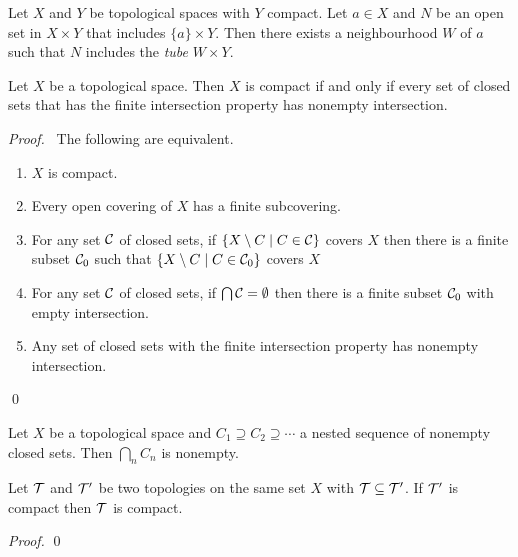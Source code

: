 \begin{corollary}
    Let $X$ and $Y$ be topological spaces with $Y$ compact. Let $a \in X$
    and $N$ be an open set in $X \times Y$ that includes $\{a\} \times Y$.
    Then there exists a neighbourhood $W$ of $a$ such that
    $N$ includes the \emph{tube} $W \times Y$.
\end{corollary}

\begin{theorem}
    \label{theorem:compact_closed_sets}
    Let $X$ be a topological space. Then $X$ is compact if and only if every set of closed sets that has the finite intersection property has nonempty intersection.
\end{theorem}

\begin{proof}
    \pf\ The following are equivalent.
    \begin{enumerate}
        \item $X$ is compact.
        \item Every open covering of $X$ has a finite subcovering.
        \item For any set $\mathcal{C}$ of closed sets, if $\{ X \setminus C \mid C \in \mathcal{C} \}$ covers $X$ then there is a finite subset $\mathcal{C}_0$ such that
        $\{ X \setminus C \mid C \in \mathcal{C}_0 \}$ covers $X$
        \item For any set $\mathcal{C}$ of closed sets, if $\bigcap \mathcal{C} = \emptyset$ then there is a finite subset $\mathcal{C}_0$ with empty intersection.
        \item Any set of closed sets with the finite intersection property has nonempty intersection.
    \end{enumerate}
    \qed
\end{proof}

\begin{corollary}
    Let $X$ be a topological space and $C_1 \supseteq C_2 \supseteq \cdots$ a nested sequence of nonempty closed sets. Then $\bigcap_n C_n$ is nonempty.
\end{corollary}

\begin{proposition}
    Let $\mathcal{T}$ and $\mathcal{T}'$ be two topologies on the same set $X$ with $\mathcal{T} \subseteq \mathcal{T}'$. If $\mathcal{T}'$ is compact then $\mathcal{T}$ is compact.
\end{proposition}

\begin{proof}
    \pf
    \qed
\end{proof}

